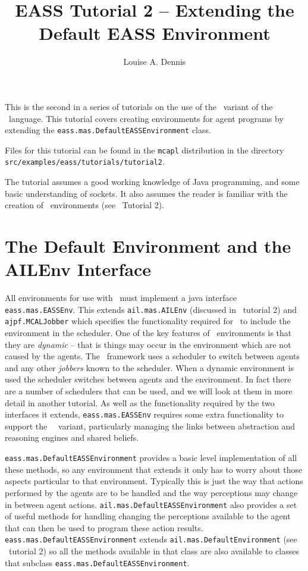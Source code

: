\documentclass[a4]{article}
\author{Louise A. Dennis}
\title{EASS Tutorial 2 -- Extending the Default EASS Environment}
\begin{document}
\maketitle
This is the second in a series of tutorials on the use of the \eass\ variant of the \gwendolen\ language.  This tutorial covers creating environments for agent programs by extending the \texttt{eass.mas.DefaultEASSEnvironment} class.  

Files for this tutorial can be found in the \texttt{mcapl} distribution in the directory \texttt{src/examples/eass/tutorials/tutorial2}.

The tutorial assumes a good working knowledge of Java programming, and some basic understanding of sockets.  It also assumes the reader is familiar with the creation of \ail\ environments (see \ail\ Tutorial 2).

\section{The Default Environment and the AILEnv Interface}
\begin{sloppypar}
All environments for use with \eass\ must implement a java interface \texttt{eass.mas.EASSEnv}.  This extends \texttt{ail.mas.AILEnv} (discussed in \ail\ tutorial 2) and \texttt{ajpf.MCALJobber} which specifies the functionality required for \ajpf\ to include the environment in the scheduler.  One of the key features of \eass\ environments is that they are \emph{dynamic} -- that is things may occur in the environment which are not caused by the agents.  The \ajpf\ framework uses a scheduler to switch between agents and any other \emph{jobbers} known to the scheduler.  When a dynamic environment is used the scheduler switches between agents and the environment.  In fact there are a number of schedulers that can be used, and we will look at them in more detail in another tutorial.  As well as the functionality required by the two interfaces it extends, \texttt{eass.mas.EASSEnv} requires some extra functionality to support the \eass\ \gwendolen\ variant, particularly managing the links between abstraction and reasoning engines and shared beliefs.

\texttt{eass.mas.DefaultEASSEnvironment} provides a basic level implementation of all these methods, so any environment that extends it only has to worry about those aspects particular to that environment.  Typically this is just the way that actions performed by the agents are to be handled and the way perceptions may change in between agent actions.  \texttt{ail.mas.DefaultEASSEnvironment} also provides a set of useful methods for handling changing the perceptions available to the agent that can then be used to program these action results.  \texttt{eass.mas.DefaultEASSEnvironment} extends \texttt{ail.mas.DefaultEnvironment} (see \ail\ tutorial 2) so all the methods available in that class are also available to classes that subclass \texttt{eass.mas.DefaultEASSEnvironment}.
\end{sloppypar}
\end{document}
